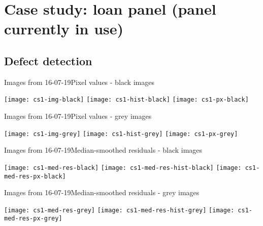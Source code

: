 \documentclass[8pt]{beamer}
\newcommand{\sctriple}{0.11}
\begin{document}

\section{Case study: loan panel (panel currently in use)}

\subsection{Defect detection}

\begin{frame}{Images from 16-07-19}{Pixel values - black images}
	\begin{center}
		\texttt{[image: cs1-img-black]}
		\texttt{[image: cs1-hist-black]}
		\texttt{[image: cs1-px-black]}
	\end{center}
\end{frame}


\begin{frame}{Images from 16-07-19}{Pixel values - grey images} %
	\begin{center}
		\texttt{[image: cs1-img-grey]}
		\texttt{[image: cs1-hist-grey]}
		\texttt{[image: cs1-px-grey]}
	\end{center}
\end{frame}


\begin{frame}{Images from 16-07-19}{Median-smoothed residuals - black images}
	\begin{center}
		\texttt{[image: cs1-med-res-black]}
		\texttt{[image: cs1-med-res-hist-black]}
		\texttt{[image: cs1-med-res-px-black]}
	\end{center}
\end{frame}


\begin{frame}{Images from 16-07-19}{Median-smoothed residuals - grey images}
	\begin{center}
		\texttt{[image: cs1-med-res-grey]}
		\texttt{[image: cs1-med-res-hist-grey]}
		\texttt{[image: cs1-med-res-px-grey]}
	\end{center}
\end{frame}
\end{document}
